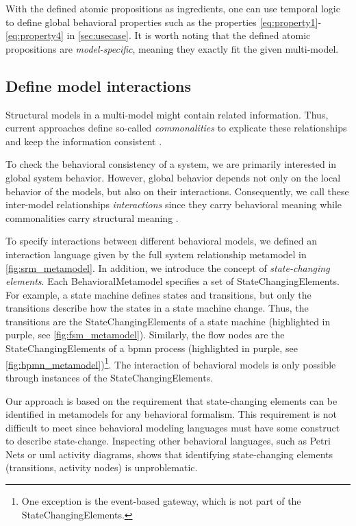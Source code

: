 \documentclass{jot}
\begin{document}
With the defined atomic propositions as ingredients, one can use temporal logic to define global behavioral properties such as the properties \eqref{eq:property1}-\eqref{eq:property4} in \autoref{sec:usecase}.
It is worth noting that the defined atomic propositions are \emph{model-specific}, meaning they exactly fit the given multi-model.


\subsection{Define model interactions}
Structural models in a multi-model might contain related information.
Thus, current approaches define so-called \emph{commonalities} to explicate these relationships and keep the information consistent \cite{stunkelComprehensiveSystemsFormal2021,klareCommonalitiesPreservingConsistency2019}.

To check the behavioral consistency of a system, we are primarily interested in global system behavior.
However, global behavior depends not only on the local behavior of the models, but also on their interactions.
Consequently, we call these inter-model relationships \emph{interactions} since they carry behavioral meaning while commonalities carry structural meaning \cite{krauterBehavioralConsistencyHeterogeneous2021}.

To specify interactions between different behavioral models, we defined an interaction language given by the full system relationship metamodel in \cref{fig:srm_metamodel}.
In addition, we introduce the concept of \emph{state-changing elements}.
Each \textsf{BehavioralMetamodel} specifies a set of \textsf{StateChangingElement}s.
For example, a state machine defines states and transitions, but only the transitions describe how the states in a state machine change.
Thus, the transitions are the \textsf{StateChangingElement}s of a state machine (highlighted in purple, see \cref{fig:fsm_metamodel}).
Similarly, the flow nodes are the \textsf{StateChangingElement}s of a \gls*{bpmn} process (highlighted in purple, see \cref{fig:bpmn_metamodel})\footnote{One exception is the event-based gateway, which is not part of the \textsf{StateChangingElement}s.}.
The interaction of behavioral models is only possible through instances of the \textsf{StateChangingElement}s.

Our approach is based on the requirement that state-changing elements can be identified in metamodels for any behavioral formalism.
This requirement is not difficult to meet since behavioral modeling languages must have some construct to describe state-change.
Inspecting other behavioral languages, such as Petri Nets or \gls*{uml} activity diagrams, shows that identifying state-changing elements (transitions, activity nodes) is unproblematic. 
\end{document}
